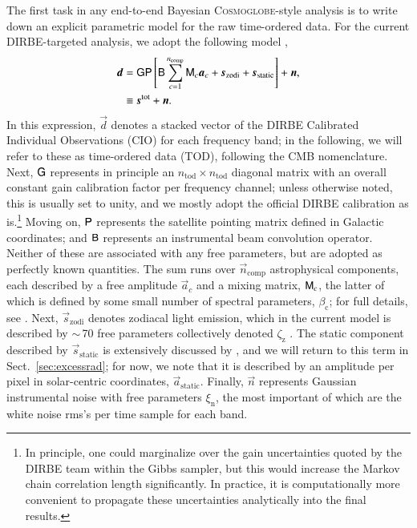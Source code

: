 \documentclass{aa}
\newcommand{\dv}[0]{\vec{d}}
\newcommand{\B}[0]{\tens{B}}
\newcommand{\G}[0]{\tens{G}}
\newcommand{\n}[0]{\vec{n}}
\newcommand{\s}[0]{\vec{s}}
\renewcommand{\a}[0]{\vec{a}}
\newcommand{\M}[0]{\tens{M}}
\renewcommand{\P}[0]{\tens{P}}
\newcommand{\cosmoglobe}{\textsc{Cosmoglobe}}
\begin{document}
The first task in any end-to-end Bayesian \cosmoglobe-style analysis
is to write down an explicit parametric model for the raw time-ordered
data. For the current DIRBE-targeted analysis, we adopt the following
model \citep{CG02_01},
\begin{align}
	\label{eq:model}
	\dv &=\G\P\left[\B\sum_{c=1}^{n_{\mathrm{comp}}}\M_c\a_c+\s_{\mathrm{zodi}} +
          \s_{\mathrm{static}}\right] + \n,\\
        &\equiv \s^{\mathrm{tot}} + \n.
\end{align}
In this expression, $\dv$ denotes a stacked vector of the DIRBE
Calibrated Individual Observations (CIO) for each frequency band; in
the following, we will refer to these as time-ordered data (TOD),
following the CMB nomenclature. Next, $\G$ represents in principle an
$n_{\mathrm{tod}}\times n_{\mathrm{tod}}$ diagonal matrix with an
overall constant gain calibration factor per frequency channel; unless
otherwise noted, this is usually set to unity, and we mostly adopt the
official DIRBE calibration as is.\footnote{In principle, one could
marginalize over the gain uncertainties quoted by the DIRBE team
within the Gibbs sampler, but this would increase the Markov chain
correlation length significantly. In practice, it is computationally
more convenient to propagate these uncertainties analytically into the
final results.}  Moving on, $\P$ represents the satellite pointing
matrix defined in Galactic coordinates; and $\B$ represents an
instrumental beam convolution operator. Neither of these are
associated with any free parameters, but are adopted as perfectly
known quantities. The sum runs over $\n_{\mathrm{comp}}$ astrophysical
components, each described by a free amplitude $\a_c$ and a mixing
matrix, $\M_c$, the latter of which is defined by some small number of
spectral parameters, $\beta_{\mathrm{c}}$; for full details, see
\citet{CG02_04, CG02_05}. Next, $\s_{\mathrm{zodi}}$ denotes zodiacal
light emission, which in the current model is described by $\sim$\,70
free parameters collectively denoted $\zeta_{\mathrm{z}}$
\citep{CG02_02}. The static component described by
$\s_{\mathrm{static}}$ is extensively discussed by \citet{CG02_01},
and we will return to this term in Sect.~\ref{sec:excessrad}; for now,
we note that it is described by an amplitude per pixel in
solar-centric coordinates, $\a_{\mathrm{static}}$. Finally, $\n$
represents Gaussian instrumental noise with free parameters
$\xi_{\mathrm{n}}$, the most important of which are the white noise
rms's per time sample for each band.
\end{document}
